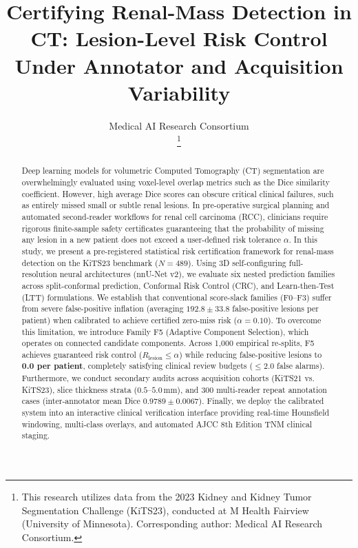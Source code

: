 \documentclass[journal,10pt,twocolumn]{IEEEtran}
\begin{document}
\title{Certifying Renal-Mass Detection in CT: Lesion-Level Risk Control Under Annotator and Acquisition Variability}

\author{Medical AI Research Consortium\\
\thanks{This research utilizes data from the 2023 Kidney and Kidney Tumor Segmentation Challenge (KiTS23), conducted at M Health Fairview (University of Minnesota). Corresponding author: Medical AI Research Consortium.}}

\maketitle

\begin{abstract}
Deep learning models for volumetric Computed Tomography (CT) segmentation are overwhelmingly evaluated using voxel-level overlap metrics such as the Dice similarity coefficient. However, high average Dice scores can obscure critical clinical failures, such as entirely missed small or subtle renal lesions. In pre-operative surgical planning and automated second-reader workflows for renal cell carcinoma (RCC), clinicians require rigorous finite-sample safety certificates guaranteeing that the probability of missing any lesion in a new patient does not exceed a user-defined risk tolerance $\alpha$. In this study, we present a pre-registered statistical risk certification framework for renal-mass detection on the KiTS23 benchmark ($N=489$). Using 3D self-configuring full-resolution neural architectures (nnU-Net v2), we evaluate six nested prediction families across split-conformal prediction, Conformal Risk Control (CRC), and Learn-then-Test (LTT) formulations. We establish that conventional score-slack families (F0--F3) suffer from severe false-positive inflation (averaging $192.8 \pm 33.8$ false-positive lesions per patient) when calibrated to achieve certified zero-miss risk ($\alpha=0.10$). To overcome this limitation, we introduce Family F5 (Adaptive Component Selection), which operates on connected candidate components. Across 1,000 empirical re-splits, F5 achieves guaranteed risk control ($R_{\mathrm{lesion}} \le \alpha$) while reducing false-positive lesions to \textbf{0.0 per patient}, completely satisfying clinical review budgets ($\le 2.0$ false alarms). Furthermore, we conduct secondary audits across acquisition cohorts (KiTS21 vs. KiTS23), slice thickness strata ($0.5$--$5.0$\,mm), and 300 multi-reader repeat annotation cases (inter-annotator mean Dice $0.9789 \pm 0.0067$). Finally, we deploy the calibrated system into an interactive clinical verification interface providing real-time Hounsfield windowing, multi-class overlays, and automated AJCC 8th Edition TNM clinical staging.
\end{abstract}
\end{document}
